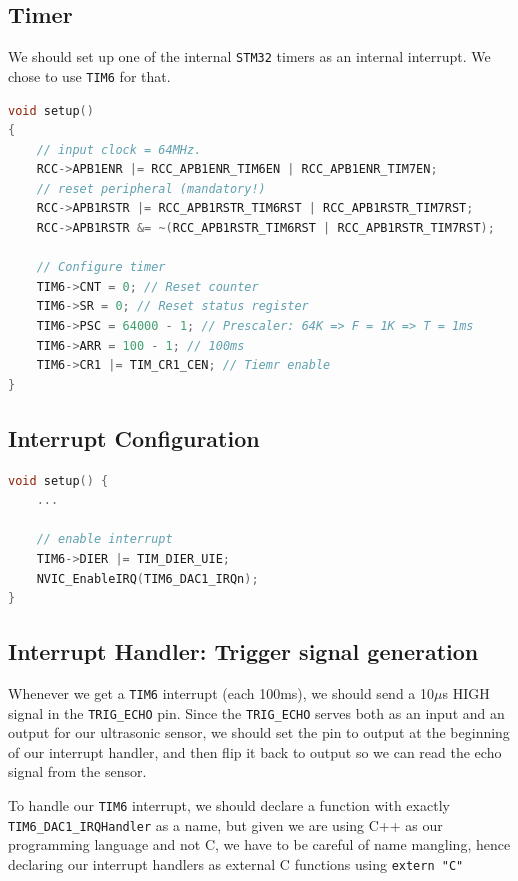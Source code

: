\documentclass{article}
\begin{document}
\subsection{Timer}

We should set up one of the internal \verb|STM32| timers as an internal interrupt. We chose to use \verb|TIM6| for that.

\begin{lstlisting}[language=C++, caption={TIM6 Configuration}]
void setup()
{
    // input clock = 64MHz.
    RCC->APB1ENR |= RCC_APB1ENR_TIM6EN | RCC_APB1ENR_TIM7EN;
    // reset peripheral (mandatory!)
    RCC->APB1RSTR |= RCC_APB1RSTR_TIM6RST | RCC_APB1RSTR_TIM7RST;
    RCC->APB1RSTR &= ~(RCC_APB1RSTR_TIM6RST | RCC_APB1RSTR_TIM7RST);

    // Configure timer
    TIM6->CNT = 0; // Reset counter
    TIM6->SR = 0; // Reset status register
    TIM6->PSC = 64000 - 1; // Prescaler: 64K => F = 1K => T = 1ms
    TIM6->ARR = 100 - 1; // 100ms
    TIM6->CR1 |= TIM_CR1_CEN; // Tiemr enable
}
\end{lstlisting}

\subsection{Interrupt Configuration}

\begin{lstlisting}[language=C++, caption={TIM6 Interrupt enable}]
void setup() {
    ...

    // enable interrupt
    TIM6->DIER |= TIM_DIER_UIE;
    NVIC_EnableIRQ(TIM6_DAC1_IRQn);
}
\end{lstlisting}

\subsection{Interrupt Handler: Trigger signal generation}

Whenever we get a \verb|TIM6| interrupt (each 100ms), we should send a 10$\mu$s HIGH signal in the \verb|TRIG_ECHO| pin. Since the \verb|TRIG_ECHO| serves both as an input and an output for our ultrasonic sensor, we should set the pin to output at the beginning of our interrupt handler, and then flip it back to output so we can read the echo signal from the sensor.

To handle our \verb|TIM6| interrupt, we should declare a function with exactly \verb|TIM6_DAC1_IRQHandler| as a name, but given we are using C++ as our programming language and not C, we have to be careful of name mangling, hence declaring our interrupt handlers as external C functions using \verb|extern "C"|
\end{document}
